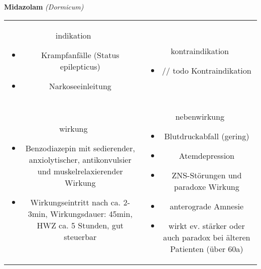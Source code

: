 \begin{frame}{
    \textbf{Midazolam}
    \textit{(Dormicum)}
}
    \begin{tabular}{c c}
        \begin{beamercolorbox}[wd=\boxwidth\textwidth,ht=\boxheight\textheight,sep=1em]{indikation}
            \begin{itemize}
                \item Krampfanfälle (Status epilepticus)
                \item Narkoseeinleitung
            \end{itemize}
        \end{beamercolorbox} & 
        \begin{beamercolorbox}[wd=\boxwidth\textwidth,ht=\boxheight\textheight,sep=1em]{kontraindikation}
            \begin{itemize}
                \item // todo Kontraindikation 
            \end{itemize}
        \end{beamercolorbox} \\
        \begin{beamercolorbox}[wd=\boxwidth\textwidth,ht=\boxheight\textheight,sep=1em]{wirkung}
            \scriptsize
            \begin{itemize}
                \item Benzodiazepin mit sedierender, anxiolytischer, antikonvulsier und muskelrelaxierender Wirkung
                \item Wirkungseintritt nach ca. 2-3min, Wirkungsdauer: 45min, HWZ ca. 5 Stunden, gut steuerbar
            \end{itemize}
        \end{beamercolorbox} & 
        \begin{beamercolorbox}[wd=\boxwidth\textwidth,ht=\boxheight\textheight,sep=1em]{nebenwirkung}
            \scriptsize
            \begin{itemize}
                \item Blutdruckabfall (gering)
                \item Atemdepression
                \item ZNS-Störungen und paradoxe Wirkung
                \item anterograde Amnesie
                \item wirkt ev. stärker oder auch paradox bei älteren Patienten (über 60a)
            \end{itemize}
        \end{beamercolorbox} \\
    \end{tabular}
\end{frame}

